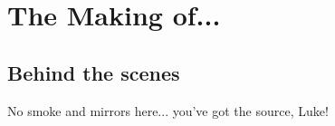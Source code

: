 \chapter{The Making of...}
		\label{appendix}


\section{Behind the scenes}

No smoke and mirrors here... you've got the source, Luke!
